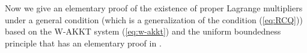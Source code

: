 \documentclass[leqno]{amsart}
\DeclareMathOperator*\uplim{lim\ sup}
\theoremstyle{definition}
\begin{document}
%
%
%

Now we give an elementary proof of the existence of proper Lagrange multipliers under a general condition (which is a generalization of the condition (\ref{eq:RCQ})) based on the W-AKKT system (\ref{eq:w-akkt}) and the uniform boundedness principle that has an elementary proof in \cite{sokal2011really}.
\end{document}
